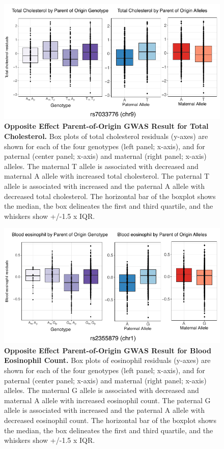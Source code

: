 \begin{figure}[!htb]
\centering
\includegraphics[width=5in]{img/ch02/fig-s11.pdf}
\caption[Opposite Effect Parent-of-Origin GWAS Result for Total Cholesterol.]{\textbf{Opposite Effect Parent-of-Origin GWAS Result for Total Cholesterol.}  Box plots of total cholesterol residuals (y-axes) are shown for each of the four genotypes (left panel; x-axis), and for paternal (center panel; x-axis) and maternal (right panel; x-axis) alleles. The maternal T allele is associated with decreased and maternal A allele with increased total cholesterol. The paternal T allele is associated with increased and the paternal A allele with decreased total cholesterol. The horizontal bar of the boxplot shows the median, the box delineates the first and third quartile, and the whiskers show +/-1.5 x IQR.}
\label{fig:fig-s11}
\end{figure}

\begin{figure}[!htb]
\centering
\includegraphics[width=5in]{img/ch02/fig-s12.pdf}
\caption[Opposite Effect Parent-of-Origin GWAS Result for Blood Eosinophil Count.]{\textbf{Opposite Effect Parent-of-Origin GWAS Result for Blood Eosinophil Count.}  Box plots of eosinophil residuals (y-axes) are shown for each of the four genotypes (left panel; x-axis), and for paternal (center panel; x-axis) and maternal (right panel; x-axis) alleles. The maternal G allele is associated with decreased and maternal A allele with increased eosinophil count. The paternal G allele is associated with increased and the paternal A allele with decreased eosinophil count. The horizontal bar of the boxplot shows the median, the box delineates the first and third quartile, and the whiskers show +/-1.5 x IQR.}
\label{fig:fig-s12}
\end{figure}

